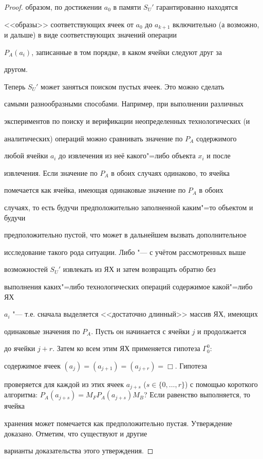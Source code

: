 \begin{proof}
образом, по достижении $a_{0}$ в памяти $S_{U}'$ гарантированно находятся

<<образы>> соответствующих ячеек от $a_{0}$ до $a_{k+1 }$ включительно (а возможно, и дальше) в виде соответствующих значений операции

$P_{A}(a_{i})$, записанные в том порядке, в каком ячейки следуют друг за

другом.



Теперь $S_{U}'$ может заняться поиском пустых ячеек. Это можно сделать

самыми разнообразными способами. Например, при выполнении различных

экспериментов по поиску и верификации неопределенных технологических (и

аналитических) операций можно сравнивать значение по $P_{A}$ содержимого

любой ячейки $a_{i}$ до извлечения из неё какого"=либо объекта $x_{i}$  и после

извлечения. Если значение по $P_{A}$ в обоих случаях одинаково, то ячейка

помечается как ячейка, имеющая одинаковые значение по $P_{A}$ в обоих

случаях, то есть будучи предположительно заполненной каким"=то объектом и будучи

предположительно пустой, что может в дальнейшем вызвать дополнительное

исследование такого рода ситуации. Либо "--- с учётом рассмотренных выше

возможностей $S_{U}'$ извлекать из ЯХ и затем возвращать обратно без

выполнения каких"=либо технологических операций содержимое какой"=либо ЯХ

$a_{i}$ "--- т.е. сначала выделяется <<достаточно длинный>> массив ЯХ, имеющих

одинаковые значения по $P_{A}$. Пусть он начинается с ячейки $j$ и продолжается

до ячейки $j+r$. Затем ко всем этим ЯХ применяется гипотеза $\Gamma^{0}_{0}$:

содержимое ячеек $(a_{j}) = (a_{j+1}) = (a_{j+r}) =\Box$. Гипотеза

проверяется для каждой из этих ячеек $a_{j+s}$ ($s\in \{0,\ldots,

r\}$) с помощью короткого алгоритма: $P_{A}(a_{j+s}) =

M_{F}P_{A}(a_{j+s})M_{B}$? Если равенство выполняется, то ячейка

хранения может помечается  как предположительно пустая. Утверждение доказано. Отметим, что существуют и другие

варианты доказательства этого утверждения.

\end{proof}



